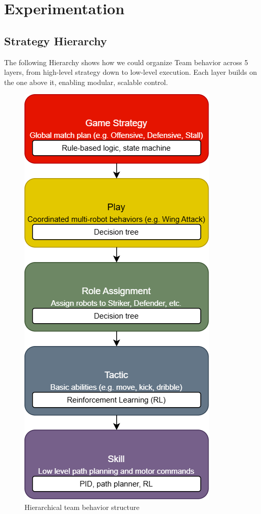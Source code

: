 \section{Experimentation}

\subsection{Strategy Hierarchy}
The following Hierarchy shows how we could organize Team behavior across 5 layers, from high-level strategy down to low-level execution. Each layer builds on the one above it, enabling modular, scalable control.

\begin{figure}[h]
    \centering
    \includegraphics[width=0.8\linewidth]{./StrategyHierarchy.png}
    \caption{Hierarchical team behavior structure}
    \label{fig:strategy_hierarchy}
\end{figure}

